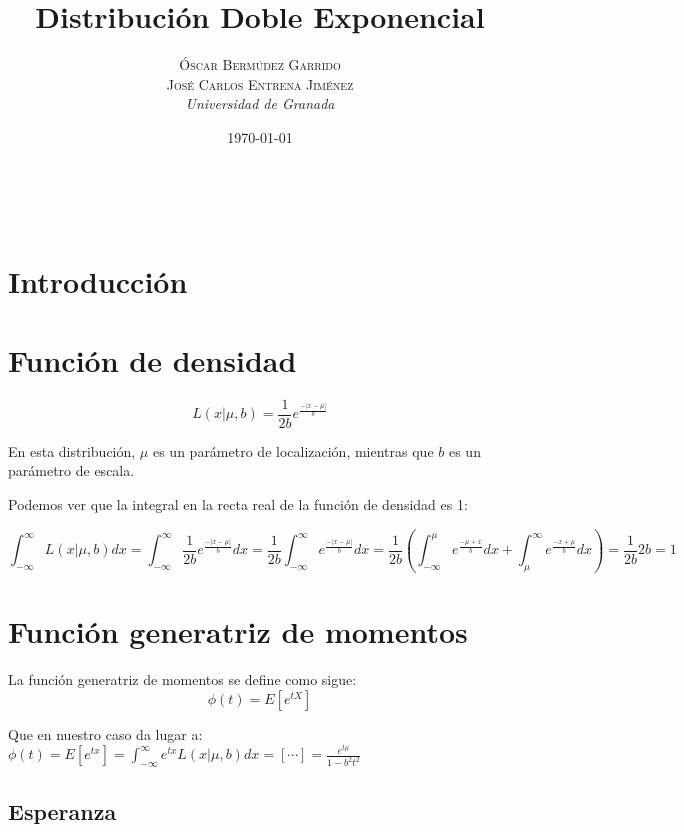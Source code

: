 \documentclass[a4paper, 10pt]{article} %
\title{\textbf{Distribución Doble Exponencial}\\ %
\vspace{20 pt}
} %
\author{\textsc{Óscar Bermúdez Garrido\\José Carlos Entrena Jiménez} %
\\{\textit{Universidad de Granada}}} %
\date{\today} %
\makeatletter
\renewcommand{\maketitle}{ %
\begin{center} %
{\Huge\@title} %
\end{center}

\vspace{20pt} %

\begin{flushright} %
{\large\@author} %
\\\@date %

\vspace{40pt} %
\end{flushright}
\renewcommand{\baselinestretch}{0.5}

}
\newcounter{def}
\makeatother
\begin{document}
\maketitle
\tableofcontents
\setcounter{page}{1}
\pagebreak

\section{Introducción}


\section{Función de densidad}

$$L(x|\mu, b)=\frac{1}{2b}e^\frac{-|x-\mu|}{b}$$

En esta distribución, $\mu$ es un parámetro de localización, mientras que $b$ es un parámetro de escala. 

Podemos ver que la integral en la recta real de la función de densidad es 1: 

$$\int_{-\infty}^{\infty} L(x|\mu, b)dx = \int_{-\infty}^{\infty} \frac{1}{2b}e^\frac{-|x-\mu|}{b}dx =
\frac{1}{2b}\int_{-\infty}^{\infty}e^\frac{-|x-\mu|}{b}dx = 
\frac{1}{2b}\left( \int_{-\infty}^{\mu}e^\frac{-\mu+x}{b}dx + \int_{\mu}^{\infty}e^\frac{-x+\mu}{b}dx \right) =
\frac{1}{2b}2b = 1$$

\section{Función generatriz de momentos}


La función generatriz de momentos se define como sigue:
$$\phi(t)=E[e^{tX}]$$

Que en nuestro caso da lugar a:\\
$\displaystyle \phi(t) = E[e^{tx}] = \int_{-\infty}^{\infty} e^{tx}L(x|\mu, b)dx =
[\cdots] = \frac {e^{t\mu}} {1-b^2t^2}$

\subsection{Esperanza}
\end{document}
